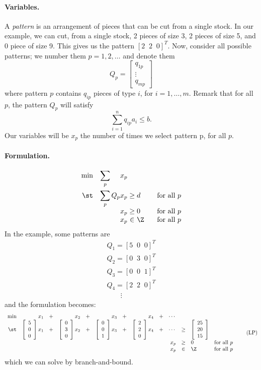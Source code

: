 \paragraph{Variables. } A \emph{pattern} is an arrangement of pieces that
can be cut from a single stock. In our example, we can cut, from a single stock,
2 pieces of size 3, 2 pieces of size 5, and 0 piece of size 9.
This gives us the pattern $[ 2 \;\; 2 \;\; 0 ]^T$.
Now, consider all possible patterns; we number them
$p = 1, 2, \ldots$ and denote them
\[
Q_p = \left[ \begin{array}{c} q_{1p} \\ \vdots \\ q_{mp} \end{array} \right]
\]
where pattern $p$ contains $q_{ip}$ pieces of type $i$, for $i = 1, \ldots, m$.
Remark that for all $p$, the pattern $Q_p$ will satisfy
\[
\sum_{i=1}^n q_{ip} a_i \leq b.
\]
Our variables will be $x_p$ the number of times we select pattern
p, for all $p$.

\paragraph{Formulation. }
\[
\begin{array}{rr@{\,}r@{\;}c@{\;}ll}
\min & \displaystyle \sum_p &     x_p & & & \\[5mm]
\st  & \displaystyle \sum_p & Q_p x_p & \geq &  d & \;\;\; \text{for all } p \\
     &        &     x_p & \geq &  0 & \;\;\; \text{for all } p \\
     &        &     x_p & \in  & \Z & \;\;\; \text{for all } p
\end{array}
\]
In the example, some patterns are
\[
\begin{array}{l}
Q_1 = [ 5 \;\; 0 \;\; 0 ]^T \\
Q_2 = [ 0 \;\; 3 \;\; 0 ]^T \\
Q_3 = [ 0 \;\; 0 \;\; 1 ]^T \\
Q_4 = [ 2 \;\; 2 \;\; 0 ]^T \\
\;\;\;\;\;\;\; \vdots
\end{array}
\]
and the formulation becomes:
\[
\begin{array}{rrcrcrcrcrcll}
\min & x_1 & + & x_2 & + & x_3 & + & x_4 & + & \cdots & & \\
\st &
	\vvec{5 \\ 0 \\ 0} x_1 & + &
	\vvec{0 \\ 3 \\ 0} x_2 & + &
	\vvec{0 \\ 0 \\ 1} x_3 & + &
	\vvec{2 \\ 2 \\ 0} x_4 & + &
	\cdots & \geq & \vvec{25 \\ 20 \\ 15} \\
 & & &  & &  & &  & & x_p & \geq & 0 & \text{for all } p\\
 & & &  & &  & &  & & x_p & \in & \Z & \text{for all } p \\
\end{array}
\tag{LP}
\]
which we can solve by branch-and-bound.

